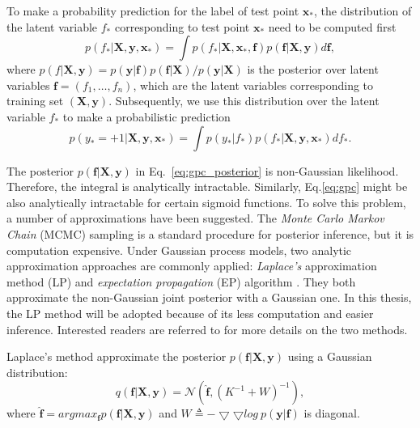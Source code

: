 To make a probability prediction for the label of test point $\mathbf{x}_*$, the distribution of the latent variable $f_*$ corresponding to test point $\mathbf{x}_*$ need to be computed first~\cite{rasmussen2006gaussian}
\begin{equation}
	p(f_*|\mathbf{X},\mathbf{y},\mathbf{x}_*) = \int p(f_*|\mathbf{X},\mathbf{x}_*,\mathbf{f}) p(\mathbf{f}|\mathbf{X},\mathbf{y})d\mathbf{f},\label{eq:gpc_posterior}
\end{equation}
where $p(f|\mathbf{X},\mathbf{y}) = p(\mathbf{y}|\mathbf{f})p(\mathbf{f}|\mathbf{X})/p(\mathbf{y}|\mathbf{X})$ is the posterior over latent variables $\mathbf{f} = (f_1,\ldots,f_n)$, which are the latent variables corresponding to training set $(\mathbf{X},\mathbf{y})$. Subsequently, we use this distribution over the latent variable $f_*$ to make a probabilistic prediction~\cite{rasmussen2006gaussian}
\begin{equation}
	p(y_*=+1|\mathbf{X},\mathbf{y},\mathbf{x}_*) = \int p(y_*|f_*)p(f_*|\mathbf{X},\mathbf{y},\mathbf{x}_*) df_* .\label{eq:gpc}
\end{equation}

The posterior $p(\mathbf{f}|\mathbf{X},\mathbf{y})$ in Eq.~\eqref{eq:gpc_posterior} is non-Gaussian likelihood. Therefore, the integral is analytically intractable. Similarly, Eq.\ref{eq:gpc} might be also analytically intractable for certain sigmoid functions. To solve this problem, a number of approximations have been suggested. The \emph{Monte Carlo Markov Chain} (MCMC) sampling is a standard procedure for posterior inference, but it is computation expensive. Under Gaussian process models, two analytic approximation approaches are commonly applied: \emph{Laplace's } approximation method (LP) \cite{williams1998bayesian} and \emph{expectation propagation} (EP) algorithm \cite{minka2001family}. They both approximate the non-Gaussian joint posterior with a Gaussian one. In this thesis, the LP method will be adopted because of its less computation and easier inference. Interested readers are referred to \cite{rasmussen2006gaussian} for more details on the two methods.

Laplace's method approximate the posterior $p(\mathbf{f}|\mathbf{X},\mathbf{y})$ using a Gaussian distribution:
\begin{equation}
	q(\mathbf{f}|\mathbf{X},\mathbf{y}) = \mathcal{N}(\hat{\mathbf{f}},(K^{-1}+W)^{-1}),
\end{equation}
where $\hat{\mathbf{f}}=argmax_\mathbf{f} p(\mathbf{f}|\mathbf{X},\mathbf{y})$ and $W \triangleq -\bigtriangledown\bigtriangledown log~p(\mathbf{y}|\mathbf{f})$ is diagonal.

